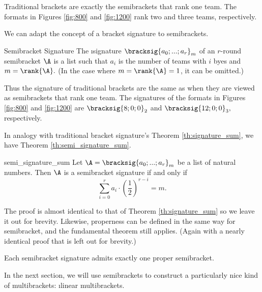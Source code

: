 {    Traditional brackets are exactly the semibrackets that rank one team. The formats in Figures \ref{fig:800} and \ref{fig:1200} rank two and three teams, respectively.

    We can adapt the concept of a bracket signature to semibrackets.

    \begin{definition}{Semibracket Signature}{}
        The \i{signature} $\bracksig{a_0; ...; a_r}_m$ of an $r$-round semibracket $\A$ is a list such that $a_i$ is the number of teams with $i$ byes and $m = \rank{\A}.$ (In the case where $m = \rank{\A} = 1$, it can be omitted.)
    \end{definition}

    Thus the signature of traditional brackets are the same as when they are viewed as semibrackets that rank one team. The signatures of the formats in Figures \ref{fig:800} and \ref{fig:1200} are $\bracksig{8;0;0}_2$ and $\bracksig{12;0;0}_3,$ respectively.

    In analogy with traditional bracket signature's Theorem \ref{th:signature_sum}, we have Theorem \ref{th:semi_signature_sum}.

    \begin{theorem}{}{semi_signature_sum}
        Let $\A = \bracksig{a_0; ...; a_r}_m$ be a list of natural numbers. Then $\A$ is a semibracket signature if and only if $$\sum_{i=0}^r a_i \cdot \left(\frac{1}{2}\right)^{r - i} = m.$$
    \end{theorem}

    The proof is almost identical to that of Theorem \ref{th:signature_sum} so we leave it out for brevity. Likewise, properness can be defined in the same way for semibracket, and the fundamental theorem still applies. (Again with a nearly identical proof that is left out for brevity.)

    \begin{theorem}{}{}
        Each semibracket signature admits exactly one proper semibracket.
    \end{theorem}

    In the next section, we will use semibrackets to construct a particularly nice kind of multibrackets: \i{linear multibrackets.}

}






